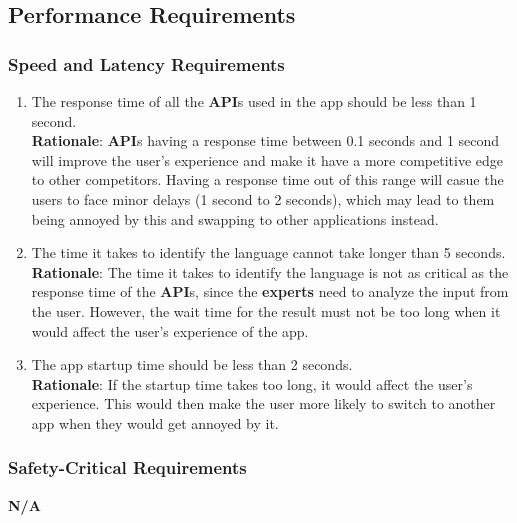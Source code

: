 
\subsection{Performance Requirements}
\label{sub:performance_requirements}

\subsubsection{Speed and Latency Requirements}
\label{ssub:speed_and_latency_requirements}
\begin{enumerate}[{PR-SL}1. ]
	\item The response time of all the \textbf{API}s used in the app should be less than 1 second.
	\\ \textbf{Rationale}: \textbf{API}s having a response time between 0.1 seconds and 1 second will improve the user's experience and make it have a more competitive edge to other competitors. Having a response time out of this range will casue the users to face minor delays (1 second to 2 seconds), which may lead to them being annoyed by this and swapping to other applications instead.
	\item The time it takes to identify the language cannot take longer than 5 seconds.
	\\ \textbf{Rationale}: The time it takes to identify the language is not as critical as the response time of the \textbf{API}s, since the \textbf{experts} need to analyze the input from the user. However, the wait time for the result must not be too long when it would affect the user's experience of the app.
	\item The app startup time should be less than 2 seconds.
	\\ \textbf{Rationale}: If the startup time takes too long, it would affect the user's experience. This would then make the user more likely to switch to another app when they would get annoyed by it.
\end{enumerate}


\subsubsection{Safety-Critical Requirements}
\label{ssub:safety_critical_requirements}
	\textbf{N/A}


